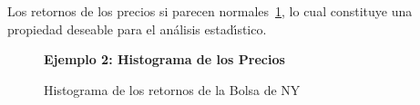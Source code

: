 \pagebreak
Los retornos de los precios si parecen normales~\ref{figura4}, lo cual constituye una propiedad deseable para el an\'alisis estad\'\i{}stico.\\
\begin{figure}[h]
	\centering
	\textbf{Ejemplo 2: Histograma de los Precios}\par\medskip
	\caption{Histograma de los retornos de la Bolsa de NY}\label{figura4}
\end{figure}

